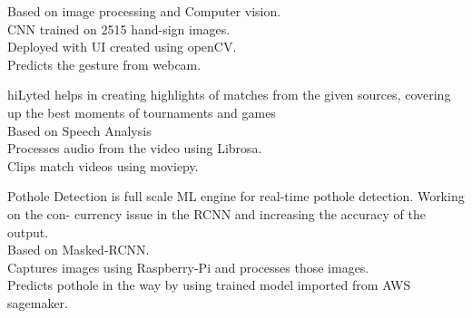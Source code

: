 \documentclass[a4paper]{deedy-resume-openfont}
\begin{document}
\begin{minipage}[t]{0.66\textwidth}
\textbullet{} Based on image processing and Computer vision. \\
\textbullet{} CNN trained on 2515 hand-sign images. \\
\textbullet{} Deployed with UI created using openCV. \\
\textbullet{} Predicts the gesture from webcam.\\
\sectionsep

hiLyted helps in creating highlights of matches from the given sources, covering
up the best moments of tournaments and games \\

\textbullet{} Based on Speech Analysis \\
\textbullet{} Processes audio from the video using Librosa. \\
\textbullet{} Clips match videos using moviepy. \\
\sectionsep

Pothole Detection is full scale ML engine for real-time pothole detection.
Working on the con- currency issue in the RCNN and increasing the accuracy
of the output.\\
\textbullet{} Based on Masked-RCNN. \\
\textbullet{} Captures images using Raspberry-Pi and processes those images. \\
\textbullet{} Predicts pothole in the way by using trained model imported from AWS sagemaker. \\
\sectionsep

\end{minipage}
\end{document}
